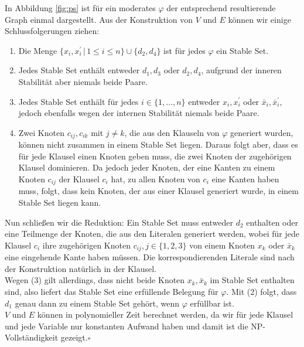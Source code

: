 \documentclass[11pt,a4paper]{article}
\newcommand{\qed}{\hfill\(\square\)}
\begin{document}
In Abbildung \ref{fig:ps} ist für ein moderates \( \varphi \) der entsprechend resultierende Graph einmal dargestellt.
Aus der Konstruktion von \( V \) und \( E \) können wir einige Schlussfolgerungen ziehen:
\begin{enumerate}
	\item Die Menge \( \lbrace x_i, x_i^\prime \,\vert\, 1 \leq i \leq n \rbrace \cup \lbrace d_2, d_4 \rbrace \) ist für jedes \( \varphi \) ein Stable Set.
	\item Jedes Stable Set enthält entweder \( d_1, d_3 \) oder \( d_2, d_4 \), aufgrund der inneren Stabilität aber niemals beide Paare.
	\item Jedes Stable Set enthält für jedes \( i \in \lbrace 1, \ldots, n \rbrace \) entweder \( x_i, x_i^\prime \) oder \( \bar{x}_i, \bar{x}_i^\prime \), jedoch ebenfalls wegen der internen Stabilität niemals beide Paare.
	\item Zwei Knoten \( c_{ij}, c_{ik} \) mit \( j \neq k \), die aus den Klauseln von \( \varphi \) generiert wurden, können nicht zusammen in einem Stable Set liegen. Daraus folgt aber, dass es für jede Klausel einen Knoten geben muss, die zwei Knoten der zugehörigen Klausel dominieren. Da jedoch jeder Knoten, der eine Kanten zu einem Knoten \( c_{ij} \) der Klausel \( c_i \) hat, zu allen Knoten von \( c_i \) eine Kanten haben muss, folgt, dass kein Knoten, der aus einer Klausel generiert wurde, in einem Stable Set liegen kann.
\end{enumerate}
Nun schließen wir die Reduktion: Ein Stable Set muss entweder \( d_2 \) enthalten oder eine Teilmenge der Knoten, die aus den Literalen generiert werden, wobei für jede Klausel \( c_i \) ihre zugehörigen Knoten \( c_{ij}, j \in \lbrace 1, 2, 3 \rbrace \) von einem Knoten \( x_k \) oder \( \bar{x}_k \) eine eingehende Kante haben müssen. Die korrespondierenden Literale sind nach der Konstruktion natürlich in der Klausel.\\
Wegen (3) gilt allerdings, dass nicht beide Knoten \( x_k, \bar{x}_k \) im Stable Set enthalten sind, also liefert das Stable Set eine erfüllende Belegung für \( \varphi \).  Mit (2) folgt, dass \( d_1 \) genau dann zu einem Stable Set gehört, wenn \( \varphi \) erfüllbar ist.\\
\( V \) und \( E \) können in polynomieller Zeit berechnet werden, da wir für jede Klausel und jede Variable nur konstanten Aufwand haben und damit ist die \textsf{NP}-Vollständigkeit gezeigt.\qed
\end{document}

